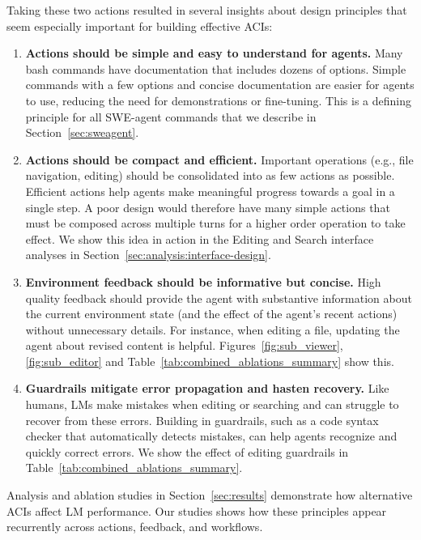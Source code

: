 Taking these two actions resulted in several insights about design principles that seem especially important for building effective ACIs:
\begin{enumerate}[leftmargin=*]
    \item \textbf{Actions should be simple and easy to understand for agents.}
    Many bash commands have documentation that includes dozens of options.
    Simple commands with a few options and concise documentation are easier for agents to use, reducing the need for demonstrations or fine-tuning.
    This is a defining principle for all SWE-agent commands that we describe in Section~\ref{sec:sweagent}.

    \item \textbf{Actions should be compact and efficient.}
    Important operations (e.g., file navigation, editing) should be consolidated into as few actions as possible.
    Efficient actions help agents make meaningful progress towards a goal in a single step.
    A poor design would therefore have many simple actions that must be composed across multiple turns for a higher order operation to take effect.
    We show this idea in action in the Editing and Search interface analyses in Section~\ref{sec:analysis:interface-design}.
    
    \item \textbf{Environment feedback should be informative but concise.}
    High quality feedback should provide the agent with substantive information about the current environment state (and the effect of the agent's recent actions) without unnecessary details.
    For instance, when editing a file, updating the agent about revised content is helpful.
    Figures~\ref{fig:sub_viewer}, \ref{fig:sub_editor} and Table~\ref{tab:combined_ablations_summary} show this.

    \item \textbf{Guardrails mitigate error propagation and hasten recovery.}
    Like humans, LMs make mistakes when editing or searching and can struggle to recover from these errors.
    Building in guardrails, such as a code syntax checker that automatically detects mistakes, can help agents recognize and quickly correct errors.
    We show the effect of editing guardrails in Table~\ref{tab:combined_ablations_summary}.
\end{enumerate}

Analysis and ablation studies in Section~\ref{sec:results} demonstrate how alternative ACIs affect LM performance.
Our studies shows how these principles appear recurrently across actions, feedback, and workflows.
